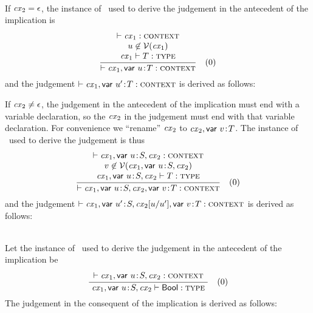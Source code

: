 \begin{bycase}
\Case{\Rcxvdec}\\
If $\mathit{cx}_2=\epsilon$, the instance of \Rcxvdec\ used to derive the judgement in
the antecedent of the implication is
\[
\frac{\begin{array}{c}\vdash\mathit{cx}_1:\textsc{context}\\u\not\in\mathcal{V}(\mathit{cx}_1)\\\mathit{cx}_1\vdash T:\textsc{type}\end{array}}{\vdash\mathit{cx}_1,\mathsf{var}\ u\!:\!T:\textsc{context}}\quad\mbox{(0)}
\]
and the judgement $\vdash\mathit{cx}_1,\mathsf{var}\ u'\!:\!T:\textsc{context}$ is derived as
follows:
\begin{derivation}
\end{derivation}
\noindent
If $\mathit{cx}_2\neq\epsilon$, the judgement in the antecedent of the implication must
end with a variable declaration, so the $\mathit{cx}_2$ in the judgement must end with
that variable declaration. For convenience we ``rename'' $\mathit{cx}_2$ to
$\mathit{cx}_2,\mathsf{var}\ v\!:\!T$. The instance of \Rcxvdec\ used to derive the judgement
is thus
\[
\rruleIII
 {\cxwf{\cxv}}
 {\var\not\in\cxvar{\cxv}}
 {\isty{\cxv}{\typ}}
 {\cxwf{\snoc{\cxv}{\vdecO}}}
 {0}
\]
and the judgement $\vdash\mathit{cx}_1,\mathsf{var}\ u'\!:\!S,\mathit{cx}_2[u/u'],\mathsf{var}\ v\!:\!T:\textsc{context}$ is derived as follows:
\begin{derivation}
\end{derivation}

\Case{\Rtbool}\\
Let the instance of \Rtbool\ used to derive the judgement in the antecedent of
the implication be
\[
\frac{\begin{array}{c}\vdash\mathit{cx}_1,\mathsf{var}\ u\!:\!S,\mathit{cx}_2:\textsc{context}\end{array}}{\mathit{cx}_1,\mathsf{var}\ u\!:\!S,\mathit{cx}_2\vdash\mathsf{Bool}:\textsc{type}}\quad\mbox{(0)}
\]
The judgement in the consequent of the implication is derived as follows:
\begin{derivation}
\end{derivation}


\end{bycase}
